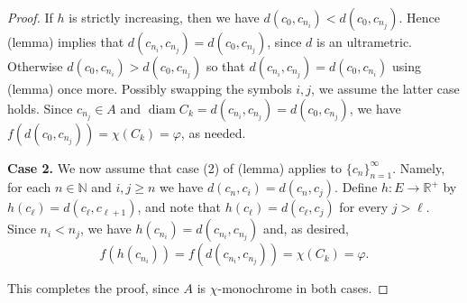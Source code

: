 \begin{proof}
If \( h  \) is strictly increasing, then we have \( d(c_0, c_{n_{i} } ) < d(c_0, c_{n_{j} } ) \). Hence (lemma) implies that \( d(c_{n_{i} } , c_{n_{j} } ) = d(c_0, c_{n_{j} } ) \), since \( d \) is an ultrametric. Otherwise \( d(c_0, c_{n_{i} } ) > d(c_0, c_{n_{j} }) \) so that \( d(c_{n_{i} } , c_{n_{j} } ) = d(c_0, c_{n_{i} } ) \) using (lemma) once more. Possibly swapping the symbols \( i,j \), we assume the latter case holds. Since \( c_{n_{j} } \in A \) and \( \operatorname{diam}C_{k} = d(c_{n_{i} } , c_{n_{j} } ) = d(c_0, c_{n_{j} } )  \), we have \( f(d(c_0, c_{n_{j} } )) = \chi (C_{k}) = \varphi \), as needed.

\textbf{Case 2.} We now assume that case (2) of (lemma) applies to \( \{ c_{n}  \}_{n = 1} ^{\infty}  \). Namely, for each \( n \in \mathbb{N}  \) and \( i,j \geq n \) we have \( d(c_{n} , c_{i} ) = d(c_{n} , c_{j} ) \). Define \( h : E \to \mathbb{R}^{+}  \) by \( h(c_{\ell}) = d(c_{\ell} , c_{\ell + 1}) \), and note that \( h(c_{\ell}) = d(c_{\ell} , c_{j})  \) for every \( j > \ell \). Since \( n_{i} < n_{j}  \), we have \( h(c_{n_{i} }) = d(c_{n_{i} } , c_{n_{j} } )\) and, as desired, \[ f(h(c_{n_{i} } )) = f(d(c_{n_{i} } , c_{n_{j} } )) = \chi (C_{k}) = \varphi. \]

This completes the proof, since \( A \) is \( \chi \)-monochrome in both cases.
\end{proof}